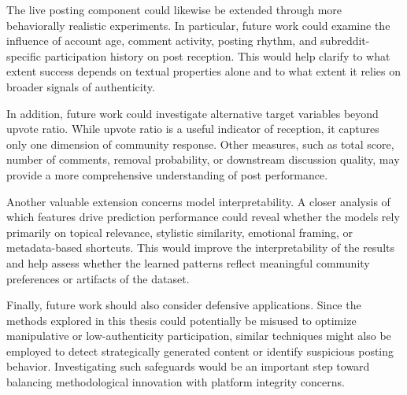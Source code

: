 The live posting component could likewise be extended through more behaviorally realistic experiments. In particular, future work could examine the influence of account age, comment activity, posting rhythm, and subreddit-specific participation history on post reception. This would help clarify to what extent success depends on textual properties alone and to what extent it relies on broader signals of authenticity.

In addition, future work could investigate alternative target variables beyond upvote ratio. While upvote ratio is a useful indicator of reception, it captures only one dimension of community response. Other measures, such as total score, number of comments, removal probability, or downstream discussion quality, may provide a more comprehensive understanding of post performance.

Another valuable extension concerns model interpretability. A closer analysis of which features drive prediction performance could reveal whether the models rely primarily on topical relevance, stylistic similarity, emotional framing, or metadata-based shortcuts. This would improve the interpretability of the results and help assess whether the learned patterns reflect meaningful community preferences or artifacts of the dataset.

Finally, future work should also consider defensive applications. Since the methods explored in this thesis could potentially be misused to optimize manipulative or low-authenticity participation, similar techniques might also be employed to detect strategically generated content or identify suspicious posting behavior. Investigating such safeguards would be an important step toward balancing methodological innovation with platform integrity concerns.